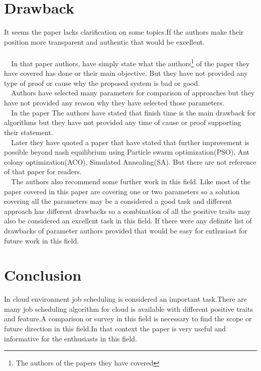 \documentclass{report}
\begin{document}
\chapter{Drawback}
It seems the paper lacks clarification on some topics.If the authors make their position more transparent and authentic that would be excellent.\\\\
\verb|  |In that paper authors, have simply state what the authors\footnote{The authors of the papers they have covered} of the paper they have covered has done or their main objective. But they have not provided any type of proof or cause why the proposed system is bad or good.\\
\verb|  |Authors have selected many parameters for comparison of approaches but they have not provided any reason why they have selected those parameters.\\
\verb|  |In the paper The authors have stated that finish time is the main drawback for algorithms but they have not provided any time of cause or proof supporting their statement. \\
\verb|  |Later they have quoted a paper that have stated that further improvement is possible beyond nash equilibrium using Particle swarm optimization(PSO), Ant colony optimization(ACO), Simulated Annealing(SA). But there are not reference of that paper for readers. \\
\verb|  |The authors also recommend some further work in this field. Like most of the paper covered in this paper are covering one or two parameters so a solution covering all the parameters may be a considered a good task and different approach has different drawbacks so a combination of all the positive traits may also be considered an excellent task in this field. If there were any definite list of drawbacks of parameter authors provided that would be easy for enthusiast for future work in this field.
\chapter{Conclusion}
In cloud environment job scheduling is considered an important task.There are many job scheduling algorithm for cloud is available with different positive traits and feature.A comparison  or survey in this field is necessary to find the scope or future direction in this field.In that context the paper is very useful and informative for the enthusiasts in this field.


\end{document}
